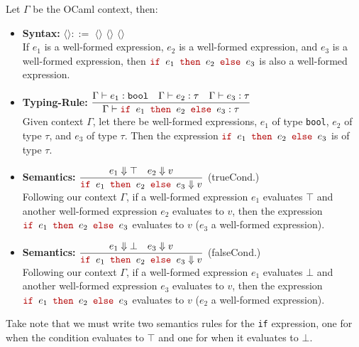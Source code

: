 \begin{Def}
    
    Let $\Gamma$ be the OCaml context, then:
    \begin{itemize}
        \item \textbf{Syntax:} \LARGE $\langle$$\rangle::=$  $\langle$$\rangle$  $\langle$$\rangle$  $\langle$$\rangle$ \normalsize\\
     
        \vspace{-.5em}
        \noindent
        If $e_1$ is a well-formed expression, $e_2$ is a well-formed expression, and $e_3$ is a well-formed expression, then $\texttr{if }e_1\texttr{ then }e_2\texttr{ else }e_3$ is also a well-formed expression.

        \item \textbf{Typing-Rule:} \LARGE $\dfrac{\Gamma\vdash e_1:\texttt{bool} \quad \Gamma\vdash e_2:\tau \quad \Gamma\vdash e_3:\tau}{\Gamma\vdash\texttr{if }e_1\texttr{ then }e_2\texttr{ else }e_3:\tau}$ \normalsize\\

        \noindent
        Given context $\Gamma$, let there be well-formed expressions, $e_1$ of type \texttt{bool}, $e_2$ of type $\tau$, and $e_3$ of type $\tau$. Then the expression $\texttr{if }e_1\texttr{ then }e_2\texttr{ else }e_3$ is of type $\tau$.

        \item \textbf{Semantics:} \LARGE $\dfrac{e_1\Downarrow \top \quad e_2\Downarrow v}{\texttr{if }e_1\texttr{ then }e_2\texttr{ else }e_3\Downarrow v}$ (trueCond.) \normalsize\\
        
        \noindent
        Following our context $\Gamma$, if a well-formed expression $e_1$ evaluates $\top$ and another well-formed expression $e_2$ evaluates to $v$, then 
        the expression $\texttr{if }e_1\texttr{ then }e_2\texttr{ else }e_3$ evaluates to $v$ ($e_3$ a well-formed expression).
        \item \textbf{Semantics:} \LARGE $\dfrac{e_1\Downarrow \bot \quad e_3\Downarrow v}{\texttr{if }e_1\texttr{ then }e_2\texttr{ else }e_3\Downarrow v}$ (falseCond.) \normalsize\\
        
        \noindent
        Following our context $\Gamma$, if a well-formed expression $e_1$ evaluates $\bot$ and another well-formed expression $e_3$ evaluates to $v$, then
        the expression $\texttr{if }e_1\texttr{ then }e_2\texttr{ else }e_3$ evaluates to $v$ ($e_2$ a well-formed expression).
    \end{itemize}

    \noindent
    Take note that we must write two semantics rules for the \texttt{if} expression, one for when the condition evaluates to $\top$ and one for when it evaluates to $\bot$.
\end{Def}

